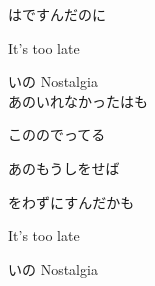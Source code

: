 {はですんだのに

It's too late

いの Nostalgia
\\

あのいれなかったはも

こののでってる

あのもうしをせば

をわずにすんだかも

It's too late

いの Nostalgia

}